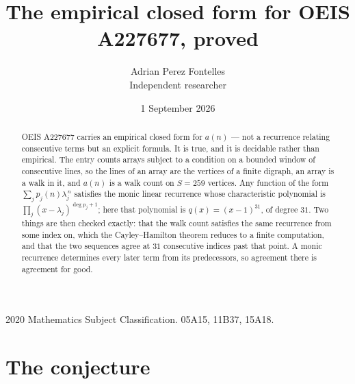 \documentclass[11pt,a4paper]{article}
\title{The empirical closed form for OEIS A227677, proved}
\author{Adrian Perez Fontelles\\ \small Independent researcher}
\date{1 September 2026}
\theoremstyle{plain}
\theoremstyle{definition}
\begin{document}
\maketitle

\begin{abstract}
OEIS A227677 carries an empirical closed form for $a(n)$ --- not a recurrence relating
consecutive terms but an explicit formula. It is true, and it is decidable rather than
empirical. The entry counts arrays subject to a condition on a bounded window of consecutive lines, so the lines of an array are the
vertices of a finite digraph, an array is a walk in it, and $a(n)$ is a walk count on
$S=259$ vertices. Any function of the form $\sum_j p_j(n)\lambda_j^{\,n}$ satisfies the
monic linear recurrence whose characteristic polynomial is
$\prod_j(x-\lambda_j)^{\deg p_j+1}$; here that polynomial is $q(x)=(x-1)^{31}$, of degree
$31$. Two things are then checked exactly: that the walk count satisfies the same
recurrence from some index on, which the Cayley--Hamilton theorem reduces to a finite
computation, and that the two sequences agree at $31$ consecutive indices past that
point. A monic recurrence determines every later term from its predecessors, so agreement
there is agreement for good.
\end{abstract}

\noindent\small 2020 Mathematics Subject Classification. 05A15, 11B37, 15A18.\normalsize

\section{The conjecture}
\end{document}
